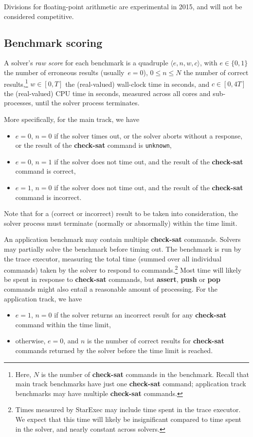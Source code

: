 \documentclass[12pt]{article}
\newcommand{\akey}[1]{\textbf{#1}}
\begin{document}
Divisions for floating-point arithmetic are experimental in 2015, and
will not be considered competitive.

\subsection{Benchmark scoring}
\label{sec:benchmark-scoring}

A solver's \emph{raw score} for each benchmark is a quadruple $\langle
e, n, w, c\rangle$, with $e \in \{0, 1\}$ the number of erroneous
results (usually~$e = 0$), $0 \leq n \leq N$ the number of correct
results,\footnote{Here, $N$ is the number of \akey{check-sat} commands
  in the benchmark.  Recall that main track benchmarks have just one
  \akey{check-sat} command; application track benchmarks may have
  multiple \akey{check-sat} commands.} $w \in [0,T]$ the (real-valued)
wall-clock time in seconds, and $c \in [0, 4T]$ the (real-valued) CPU
time in seconds, measured across all cores and sub-processes, until
the solver process terminates.

 More specifically, for the main track, we have
%
\begin{itemize}
\item $e=0$, $n=0$ if the solver times out, or the solver aborts
  without a response, or the result of the \akey{check-sat} command is
  {\tt unknown},
\item $e=0$, $n=1$ if the solver does not time out, and the result of
  the \akey{check-sat} command is correct,
\item $e=1$, $n=0$ if the solver does not time out, and the result of
  the \akey{check-sat} command is incorrect.
\end{itemize}
%
Note that for a (correct or incorrect) result to be taken into
consideration, the solver process must terminate (normally or
abnormally) within the time limit.

%
An application benchmark may contain multiple \akey{check-sat}
commands.  Solvers may partially solve the benchmark before timing
out.  The benchmark is run by the trace executor, measuring the total
time (summed over all individual commands) taken by the solver to
respond to commands.\footnote{Times measured by StarExec may include
  time spent in the trace executor.  We expect that this time will
  likely be insignificant compared to time spent in the solver, and
  nearly constant across solvers.}  Most time will likely be spent in
response to \akey{check-sat} commands, but \akey{assert}, \akey{push}
or \akey{pop} commands might also entail a reasonable amount of
processing.  For the application track, we have
\begin{itemize}
\item $e=1$, $n=0$ if the solver returns an incorrect result for any
  \akey{check-sat} command within the time limit,
\item otherwise, $e=0$, and $n$ is the number of correct results for
  \akey{check-sat} commands returned by the solver before the time
  limit is reached.
\end{itemize}
\end{document}
